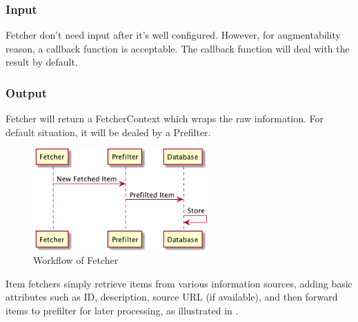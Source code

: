   \subsubsection{Input}
    Fetcher don't need input after it's well configured. However, for augmentability reason, a callback function is acceptable.
    The callback function will deal with the result by default.

  \subsubsection{Output}
    Fetcher will return a FetcherContext which wraps the raw information. For default situation, it will be dealed by a Prefilter.

  \begin{figure}[H]
    \centering
    \includegraphics[width=0.6\textwidth]{img/fetch.png}
    \caption{Workflow of Fetcher \label{fig:fetcher}}
  \end{figure}


  Item fetchers simply retrieve items from various information sources,
  adding basic attributes such as ID, description, source URL (if
  available), and then forward items to prefilter for later processing, as illustrated in .

